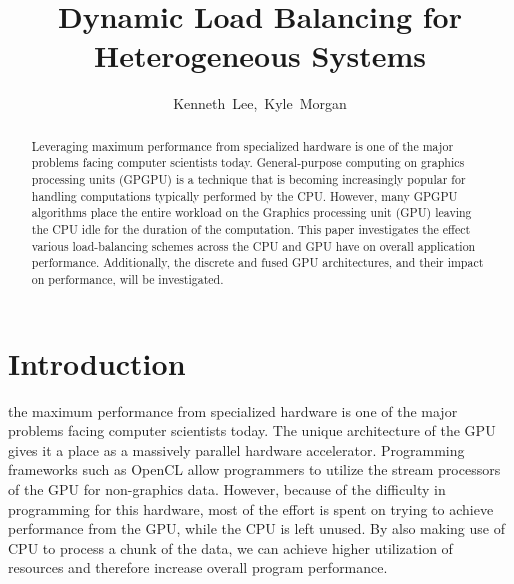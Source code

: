 \documentclass[journal]{IEEEtran}
\begin{document}
\title{Dynamic Load Balancing for\\Heterogeneous Systems}

\author{Kenneth~Lee,~Kyle~Morgan}%


\maketitle

\begin{abstract}
Leveraging maximum performance from specialized hardware is one of the
major problems facing computer scientists today.  General-purpose computing
on graphics processing units (GPGPU) is a technique that is becoming
increasingly popular for handling computations typically performed by the
CPU.  However, many GPGPU algorithms place the entire workload on the Graphics
processing unit (GPU) leaving the CPU idle for the duration of the computation.
This paper investigates the effect various load-balancing schemes across the CPU
and GPU have on overall application performance.  Additionally, the discrete and
fused GPU architectures, and their impact on performance, will be investigated.
\end{abstract}

\section{Introduction}
% 
% 
% 
 the maximum performance from specialized hardware is one
of the major problems facing computer scientists today.  The unique architecture of the
GPU gives it a place as a massively parallel hardware accelerator.  Programming frameworks
such as OpenCL allow programmers to utilize the stream processors of the GPU for non-graphics
data.  However, because of the difficulty in programming for this hardware, most of the
effort is spent on trying to achieve performance from the GPU, while the CPU is left
unused.  By also making use of CPU to process a chunk of the data, we can achieve higher
utilization of resources and therefore increase overall program performance.
\end{document}
